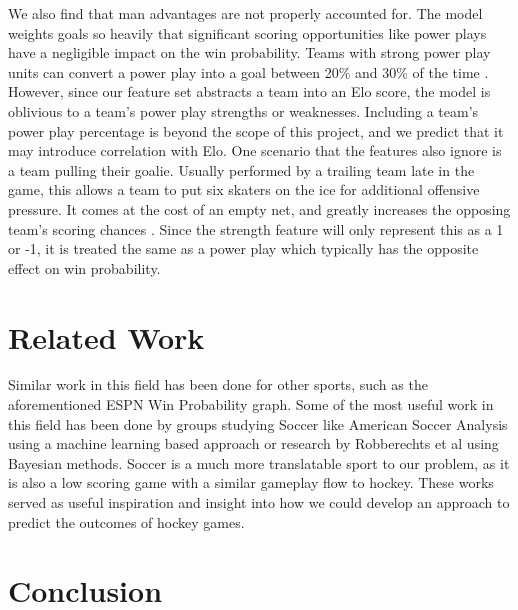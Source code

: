 \documentclass{article}
\begin{document}
We also find that man advantages are not properly accounted for.
The model weights goals so heavily that significant scoring opportunities like power plays have a negligible impact on the win probability.
Teams with strong power play units can convert a power play into a goal between 20\% and 30\% of the time \cite{powerplay}.
However, since our feature set abstracts a team into an Elo score, the model is oblivious to a team's power play strengths or weaknesses.
Including a team's power play percentage is beyond the scope of this project, and we predict that it may introduce correlation with Elo.
One scenario that the features also ignore is a team pulling their goalie.
Usually performed by a trailing team late in the game, this allows a team to put six skaters on the ice for additional offensive pressure.
It comes at the cost of an empty net, and greatly increases the opposing team's scoring chances \cite{goaliepull}.
Since the strength feature will only represent this as a 1 or -1, it is treated the same as a power play which typically has the opposite effect on win probability.

\section{Related Work}
Similar work in this field has been done for other sports, such as the aforementioned ESPN Win Probability graph.
Some of the most useful work in this field has been done by groups studying Soccer like American Soccer Analysis using a 
machine learning based approach \cite{richardett} or research by Robberechts et al \cite{bayesian} using Bayesian methods. Soccer
is a much more translatable sport to our problem, as it is also a low scoring game with a similar gameplay flow to hockey.
These works served as useful inspiration and insight into how we could develop an approach to predict the outcomes of hockey games.

\section{Conclusion}

\nocite{*}


\end{document}

